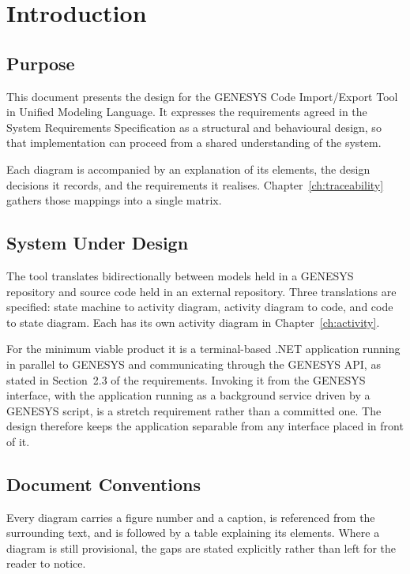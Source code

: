 \chapter{Introduction}
\label{ch:intro}

\section{Purpose}

This document presents the design for the GENESYS Code Import/Export Tool in
Unified Modeling Language. It expresses the requirements agreed in the System
Requirements Specification as a structural and behavioural design, so that
implementation can proceed from a shared understanding of the system.

Each diagram is accompanied by an explanation of its elements, the design
decisions it records, and the requirements it realises. Chapter~\ref{ch:traceability}
gathers those mappings into a single matrix.

\section{System Under Design}

The tool translates bidirectionally between models held in a GENESYS repository
and source code held in an external repository. Three translations are specified:
state machine to activity diagram, activity diagram to code, and code to state
diagram. Each has its own activity diagram in Chapter~\ref{ch:activity}.

For the minimum viable product it is a terminal-based .NET application running in
parallel to GENESYS and communicating through the GENESYS API, as stated in
Section~2.3 of the requirements. Invoking it from the GENESYS interface, with the
application running as a background service driven by a GENESYS script, is a
stretch requirement rather than a committed one. The design therefore keeps the
application separable from any interface placed in front of it.

\section{Document Conventions}

Every diagram carries a figure number and a caption, is referenced from the
surrounding text, and is followed by a table explaining its elements. Where a
diagram is still provisional, the gaps are stated explicitly rather than left for
the reader to notice.

